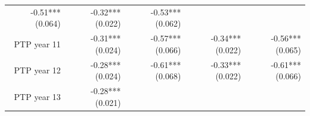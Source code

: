 \documentclass[]{article}
\begin{document}
\begin{longtable}[c]{@{}rrrrr@{}}
\begin{minipage}[t]{0.16\columnwidth}
-0.51*** (0.064)
\strut\end{minipage} &
\begin{minipage}[t]{0.21\columnwidth}\raggedleft\strut
-0.32*** (0.022)
\strut\end{minipage} &
\begin{minipage}[t]{0.15\columnwidth}\raggedleft\strut
-0.53*** (0.062)
\strut\end{minipage}\tabularnewline
\begin{minipage}[t]{0.17\columnwidth}\raggedleft\strut
PTP year 11
\strut\end{minipage} &
\begin{minipage}[t]{0.18\columnwidth}\raggedleft\strut
-0.31*** (0.024)
\strut\end{minipage} &
\begin{minipage}[t]{0.16\columnwidth}\raggedleft\strut
-0.57*** (0.066)
\strut\end{minipage} &
\begin{minipage}[t]{0.21\columnwidth}\raggedleft\strut
-0.34*** (0.022)
\strut\end{minipage} &
\begin{minipage}[t]{0.15\columnwidth}\raggedleft\strut
-0.56*** (0.065)
\strut\end{minipage}\tabularnewline
\begin{minipage}[t]{0.17\columnwidth}\raggedleft\strut
PTP year 12
\strut\end{minipage} &
\begin{minipage}[t]{0.18\columnwidth}\raggedleft\strut
-0.28*** (0.024)
\strut\end{minipage} &
\begin{minipage}[t]{0.16\columnwidth}\raggedleft\strut
-0.61*** (0.068)
\strut\end{minipage} &
\begin{minipage}[t]{0.21\columnwidth}\raggedleft\strut
-0.33*** (0.022)
\strut\end{minipage} &
\begin{minipage}[t]{0.15\columnwidth}\raggedleft\strut
-0.61*** (0.066)
\strut\end{minipage}\tabularnewline
\begin{minipage}[t]{0.17\columnwidth}\raggedleft\strut
PTP year 13
\strut\end{minipage} &
\begin{minipage}[t]{0.18\columnwidth}\raggedleft\strut
-0.28*** (0.021)
\strut\end{minipage} &
\begin{minipage}[t]{0.16\columnwidth}\raggedleft\strut

\end{minipage}
\end{longtable}
\end{document}
